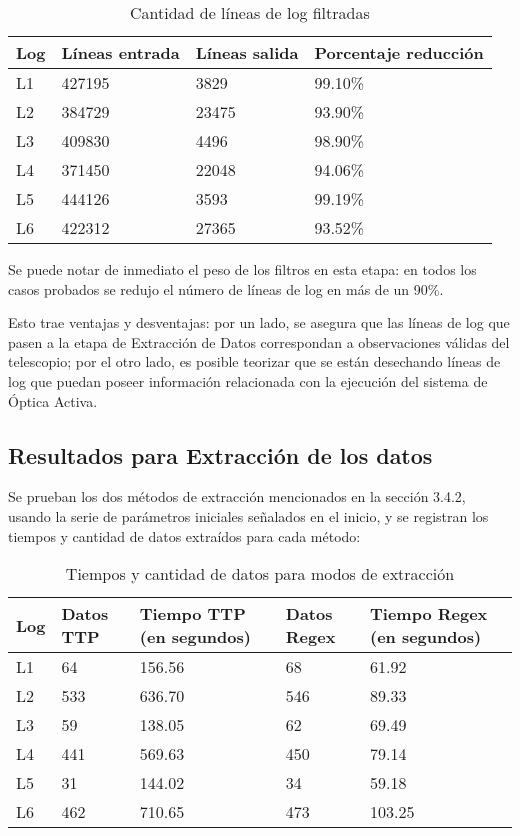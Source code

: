 \begin{table}[h]
    \centering
    \caption{\label{table:etapa1} Cantidad de líneas de log filtradas}
    \begin{tabular}{|p{3.5cm}|p{3.5cm}|p{3.5cm}|p{3.5cm}|}
        \hline
        Log & Líneas entrada & Líneas salida & Porcentaje reducción \\
        \hline
        L1 & 427195 & 3829 & 99.10\% \\
        \hline
        L2 & 384729 & 23475 & 93.90\% \\
        \hline
        L3 & 409830 & 4496 & 98.90\% \\
        \hline
        L4 & 371450 & 22048 & 94.06\% \\
        \hline
        L5 & 444126 & 3593 & 99.19\% \\
        \hline
        L6 & 422312 & 27365 & 93.52\% \\
        \hline
    \end{tabular}
\end{table}

Se puede notar de inmediato el peso de los filtros en esta etapa: en todos los casos probados se redujo el número de líneas de log en más de un 90\%.

Esto trae ventajas y desventajas: por un lado, se asegura que las líneas de log que pasen a la etapa de Extracción de Datos correspondan a observaciones válidas del telescopio; por el otro lado, es posible teorizar que se están desechando líneas de log que puedan poseer información relacionada con la ejecución del sistema de Óptica Activa.

\subsection{Resultados para Extracción de los datos}

Se prueban los dos métodos de extracción mencionados en la sección 3.4.2, usando la serie de parámetros iniciales señalados en el inicio, y se registran los tiempos y cantidad de datos extraídos para cada método:

\begin{table}[h]
    \centering
    \caption{\label{table:etapa2} Tiempos y cantidad de datos para modos de extracción}
    \begin{tabular}{|p{2cm}|p{3cm}|p{3cm}|p{3cm}|p{3cm}|}
        \hline
        Log & Datos TTP & Tiempo TTP (en segundos) & Datos Regex & Tiempo Regex (en segundos) \\
        \hline
        L1 & 64 & 156.56 & 68 & 61.92 \\
        \hline
        L2 & 533 & 636.70 & 546 & 89.33 \\
        \hline
        L3 & 59 & 138.05 & 62 & 69.49 \\
        \hline
        L4 & 441 & 569.63 & 450 & 79.14 \\
        \hline
        L5 & 31 & 144.02 & 34 & 59.18 \\
        \hline
        L6 & 462 & 710.65 & 473 & 103.25 \\
        \hline
    \end{tabular}
\end{table}


